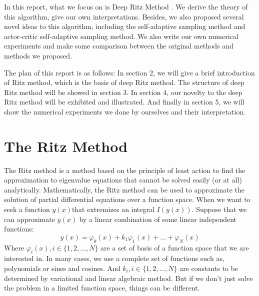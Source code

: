 \documentclass{article}
\begin{document}
\par In this report, what we focus on is Deep Ritz Method \cite{yu2017deep}. We derive the theory of this algorithm, give our own interpretations. Besides, we also proposed several novel ideas to this algorithm, including the self-adaptive sampling method and actor-critic self-adaptive sampling method. We also write our own numerical experiments and make some comparison between the original methods and methods we proposed.
\par The plan of this report is as follows: In section 2, we will give a brief introduction of Ritz method, which is the basis of deep Ritz method. The structure of deep Ritz method will be showed in section 3. In section 4, our novelty to the deep Ritz method will be exhibited and illustrated. And finally in section 5, we will show the numerical experiments we done by ourselves and their interpretation.

\section{The Ritz Method}  %
\par The Ritz method is a method based on the principle of least action to find the approximation to eigenvalue equations that cannot be solved easily (or at all) analytically. Mathematically, the Ritz method can be used to approximate the solution of partial differential equations over a function space. When we want to seek a function $y(x)$that extremizes an integral $I(y(x))$. Suppose that we can approximate $y(x)$ by a linear combination of some linear independent  functions:
\begin{equation}
y(x)=\varphi_0(x)+k_1\varphi_1(x)+...+\varphi_N(x)
\end{equation}
Where $\varphi_{i}(x),i\in\{1,2,...,N\}$  are a set of basis of a function space that we are interested in. In many cases, we use a complete set of functions such as, polynomials or sines and cosines. And $k_i,i\in\{1,2,...,N\}$ are constants to be determined by variational and linear algebraic method. But if we don't just solve the problem in a limited function space, things can be different. 
\end{document}
